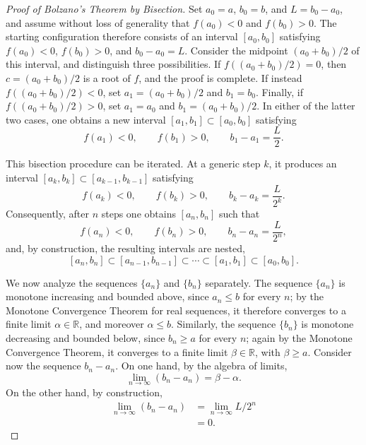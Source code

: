 \begin{proof}[Proof of Bolzano's Theorem by Bisection]
Set $a_0 = a$, $b_0 = b$, and $L = b_0 - a_0$, and assume without loss of generality that $f(a_0) < 0$ and $f(b_0) > 0$. The starting configuration therefore consists of an interval $[a_0, b_0]$ satisfying $f(a_0) < 0$, $f(b_0) > 0$, and $b_0 - a_0 = L$. Consider the midpoint $(a_0 + b_0)/2$ of this interval, and distinguish three possibilities. If $f( (a_0+b_0)/2 ) = 0$, then $c = (a_0+b_0)/2$ is a root of $f$, and the proof is complete. If instead $f( (a_0+b_0)/2 ) < 0$, set $a_1 = (a_0+b_0)/2$ and $b_1 = b_0$. Finally, if $f( (a_0+b_0)/2 ) > 0$, set $a_1 = a_0$ and $b_1 = (a_0+b_0)/2$. In either of the latter two cases, one obtains a new interval $[a_1, b_1] \subset [a_0, b_0]$ satisfying
\[
f(a_1) < 0, \qquad f(b_1) > 0, \qquad b_1 - a_1 = \frac{L}{2}.
\]

This bisection procedure can be iterated. At a generic step $k$, it
produces an interval $[a_k,b_k]\subset[a_{k-1},b_{k-1}]$ satisfying
\[
f(a_k)<0,\qquad f(b_k)>0,\qquad b_k-a_k=\frac{L}{2^k}.
\]
Consequently, after $n$ steps one obtains $[a_n,b_n]$ such that
\[
f(a_n) < 0, \qquad f(b_n) > 0, \qquad b_n - a_n = \frac{L}{2^n},
\]
and, by construction, the resulting intervals are nested,
\[
[a_n, b_n] \subset [a_{n-1}, b_{n-1}] \subset \cdots \subset [a_1, b_1] \subset [a_0, b_0].
\]

We now analyze the sequences $\{a_n\}$ and $\{b_n\}$ separately. The sequence $\{a_n\}$ is monotone increasing and bounded above, since $a_n \leq b$ for every $n$; by the Monotone Convergence Theorem for real sequences, it therefore converges to a finite limit $\alpha \in \mathbb{R}$, and moreover $\alpha \leq b$. Similarly, the sequence $\{b_n\}$ is monotone decreasing and bounded below, since $b_n \geq a$ for every $n$; again by the Monotone Convergence Theorem, it converges to a finite limit $\beta \in \mathbb{R}$, with $\beta \geq a$. Consider now the sequence $b_n - a_n$. On one hand, by the algebra of limits,
\[
\lim_{n \to \infty} (b_n - a_n) = \beta - \alpha.
\]
On the other hand, by construction,
\[
\begin{aligned}
\lim_{n \to \infty} (b_n - a_n) &= \lim_{n \to \infty} L / 2^n \\
&= 0.
\end{aligned}
\]


\end{proof}
